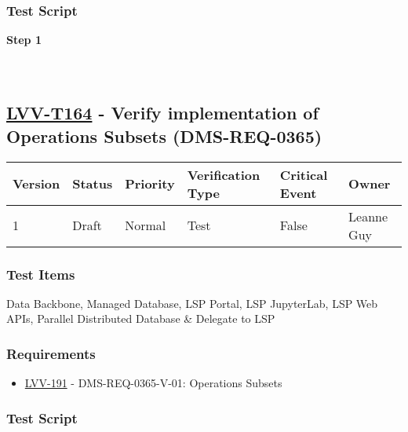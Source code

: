 \hypertarget{test-script-63}{%
\subsubsection{Test Script}\label{test-script-63}}

\textbf{Step 1}\\
~\\
~\\

\hypertarget{lvv-t164---verify-implementation-of-operations-subsets-dms-req-0365}{%
\subsection{\texorpdfstring{\href{https://jira.lsstcorp.org/secure/Tests.jspa\#/testCase/LVV-T164}{LVV-T164}
- Verify implementation of Operations Subsets
(DMS-REQ-0365)}{LVV-T164 - Verify implementation of Operations Subsets (DMS-REQ-0365)}}\label{lvv-t164---verify-implementation-of-operations-subsets-dms-req-0365}}

\begin{longtable}[]{@{}llllll@{}}
\toprule
Version & Status & Priority & Verification Type & Critical Event &
Owner\tabularnewline
\midrule
\endhead
1 & Draft & Normal & Test & False & Leanne Guy\tabularnewline
\bottomrule
\end{longtable}

\hypertarget{test-items-64}{%
\subsubsection{Test Items}\label{test-items-64}}

Data Backbone, Managed Database, LSP Portal, LSP JupyterLab, LSP Web
APIs, Parallel Distributed Database \& Delegate to LSP

\hypertarget{requirements-64}{%
\subsubsection{Requirements}\label{requirements-64}}

\begin{itemize}
\tightlist
\item
  \href{https://jira.lsstcorp.org/browse/LVV-191}{LVV-191} -
  DMS-REQ-0365-V-01: Operations Subsets
\end{itemize}

\hypertarget{test-script-64}{%
\subsubsection{Test Script}\label{test-script-64}}

